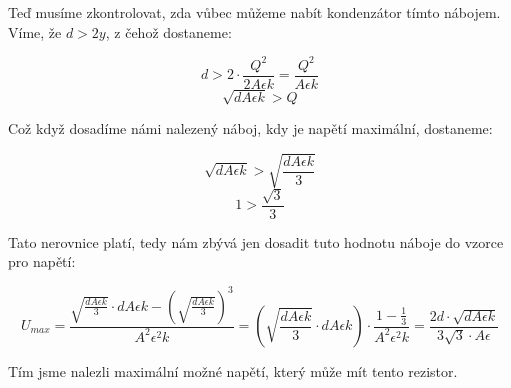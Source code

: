 \documentclass{fkssolpub}
\begin{document}
Teď musíme zkontrolovat, zda vůbec můžeme nabít kondenzátor tímto nábojem. Víme, že $d > 2y$, z čehož dostaneme:

\[
	d > 2 \cdot \frac{Q^2}{2 A \epsilon k} = \frac{Q^2}{A \epsilon k}
\]
\[
	\sqrt{d A \epsilon k} > Q
\]

Což když dosadíme námi nalezený náboj, kdy je napětí maximální, dostaneme:

\[
	\sqrt{d A \epsilon k} > \sqrt{\frac{d A \epsilon k}{3}}
\]
\[
	1 > \frac{\sqrt{3}}{3}
\]

Tato nerovnice platí, tedy nám zbývá jen dosadit tuto hodnotu náboje do vzorce pro napětí:

\[
	U_{max} = \frac{\sqrt{\frac{d A \epsilon k}{3}} \cdot d A \epsilon k - \left(\sqrt{\frac{d A \epsilon k}{3}}\right)^3}{A^2 \epsilon^2 k}
	= \left(\sqrt{\frac{d A \epsilon k}{3}} \cdot d A \epsilon k\right) \cdot \frac{1 - \frac{1}{3}}{A^2 \epsilon^2 k}
	= \frac{2 d \cdot \sqrt{d A \epsilon k}}{3 \sqrt{3} \cdot A \epsilon}
\]

Tím jsme nalezli maximální možné napětí, který může mít tento rezistor.
\end{document}

